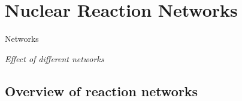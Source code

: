 \documentclass[
	11pt, %
]{beamer}
\begin{document}


\section{Nuclear Reaction Networks}

\begin{frame}{Networks}
    \begin{center}
        \Huge {\it Effect of different networks}
    \end{center}
\end{frame}

\subsection{Overview of reaction networks}
\end{document}
